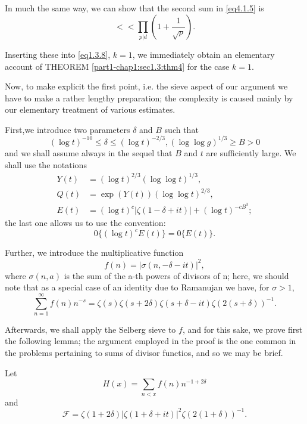 In much the same way, we can show that the second sum in \eqref{eq4.1.5} is 
$$
<< \prod_{p | d} \left(1 + \frac{1}{\sqrt{p}}\right).
$$

Inserting these into \eqref{eq1.3.8}, $k = 1$, we immediately obtain an
elementary account of THEOREM \ref{part1-chap1:sec1.3:thm4} for the case $k = 1$. 

Now, to make explicit the first point, i.e. the sieve aspect of our
argument we have to make a rather lengthy preparation;  the complexity
is caused mainly by our elementary treatment of various estimates. 

First,\pageoriginale we introduce two parameters $\delta$ and $B$ such that 
\begin{equation*}
  (\log t)^{-10} \leq \delta \leq (\log t)^{-2/3}, (\log \log g)^{1/3}
  \geq B > 0 \tag{4.1.7} \label{eq4.1.7}
\end{equation*}
and we shall assume always in the sequel that $B$ and $t$ are
sufficiently large. We shall use the notations 
\begin{align*}
  Y(t) &= (\log t)^{2/3} (\log \log t)^{1/3},\\
  Q(t) &= \exp (Y(t)) (\log \log t)^{2/3},\\
  E(t) &= (\log t)^c | \zeta (1 - \delta + it) | + (\log t)^{-cB^3};
\end{align*}
the last one allows us to use the convention:
$$
0\{ (\log t)^c E(t) \} = 0 \{ E(t) \}.
$$

Further, we introduce the multiplicative function
$$
f(n) = | \sigma (n, - \delta - it) |^2,
$$
where $\sigma (n, a)$ is the sum of the a-th powers of divisors of n;
here, we should note that as a special case of an identity due to
Ramanujan we have, for $\sigma > 1$, 
\begin{equation*}
  \sum_{n=1}^\infty f(n)n^{-s} = \zeta (s) \zeta (s + 2 \delta ) \zeta
  (s + \delta - it) \zeta (2(s + \delta
  ))^{-1}. \tag{4.1.8} \label{eq4.1.8} 
\end{equation*}

Afterwards, we shall apply the Selberg sieve to $f$, and for this
sake, we prove first the following lemma; the argument employed in the
proof is the one common in the problems pertaining to sums of divisor
functios, and so we may be brief. 
\begin{Lemma}\label{chap4-lem18}%
  Let\pageoriginale
  $$
  H(x) = \sum_{n<x} f(n) n^{-1 + 2\delta}
  $$
  and
  $$
  \mathscr{F} = \zeta (1+ 2\delta) | \zeta (1+\delta + it) |^2 \zeta
  (2(1+\delta ))^{-1}. 
  $$
\end{Lemma}

